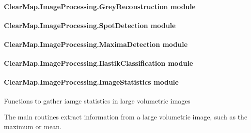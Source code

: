 \documentclass[letterpaper,10pt,english]{sphinxmanual}
\begin{document}
\paragraph{ClearMap.ImageProcessing.GreyReconstruction module}
\label{api/ClearMap.ImageProcessing:clearmap-imageprocessing-greyreconstruction-module}

\paragraph{ClearMap.ImageProcessing.SpotDetection module}
\label{api/ClearMap.ImageProcessing:clearmap-imageprocessing-spotdetection-module}

\paragraph{ClearMap.ImageProcessing.MaximaDetection module}
\label{api/ClearMap.ImageProcessing:clearmap-imageprocessing-maximadetection-module}

\paragraph{ClearMap.ImageProcessing.IlastikClassification module}
\label{api/ClearMap.ImageProcessing:clearmap-imageprocessing-ilastikclassification-module}

\paragraph{ClearMap.ImageProcessing.ImageStatistics module}
\label{api/ClearMap.ImageProcessing:module-ClearMap.ImageProcessing.ImageStatistics}\label{api/ClearMap.ImageProcessing:clearmap-imageprocessing-imagestatistics-module}
Functions to gather iamge statistics in large volumetric images

The main routines extract information from a large volumetric image, such as
the maximum or mean.
\end{document}

